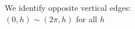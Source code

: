 \documentclass[preview]{standalone}
\begin{document}
\begin{center}
We identify opposite vertical edges:\\$(0, h) \sim (2\pi, h)$ for all $h$
\end{center}
\end{document}

